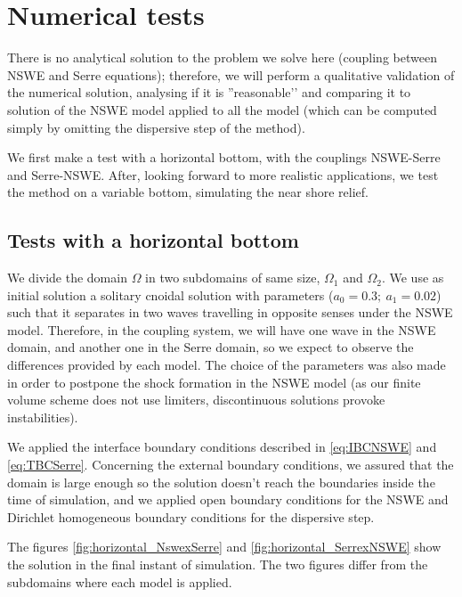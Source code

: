 \section{Numerical tests}

\indent There is no analytical solution to the problem we solve here (coupling between NSWE and Serre equations); therefore, we will perform a qualitative validation of the numerical solution, analysing if it is ''reasonable’’ and comparing it to solution of the NSWE model applied to all the model (which can be computed simply by omitting the dispersive step of the method).

\indent We first make a test with a horizontal bottom, with the couplings NSWE-Serre and Serre-NSWE. After, looking forward to more realistic applications, we test the method on a variable bottom, simulating the near shore relief.

\subsection{Tests with a horizontal bottom}

\indent We divide the domain $\Omega$ in two subdomains of same size, $\Omega_1$ and $\Omega_2$. We use as initial solution a solitary cnoidal solution with parameters ($a_0 = 0.3; \ a_1 = 0.02$) such that it separates in two waves travelling in opposite senses under the NSWE model. Therefore, in the coupling system, we will have one wave in the NSWE domain, and another one in the Serre domain, so we expect to observe the differences provided by each model. The choice of the parameters was also made in order to postpone the shock formation in the NSWE model (as our finite volume scheme does not use limiters, discontinuous solutions provoke instabilities).

\indent We applied the interface boundary conditions described in \eqref{eq:IBCNSWE} and \eqref{eq:TBCSerre}. Concerning the external boundary conditions, we assured that the domain is large enough so the solution doesn't reach the boundaries inside the time of simulation, and we applied open boundary conditions for the NSWE and Dirichlet homogeneous boundary conditions for the dispersive step.

\indent The figures \ref{fig:horizontal_NswexSerre} and \ref{fig:horizontal_SerrexNSWE} show the solution in the final instant of simulation. The two figures differ from the subdomains where each model is applied.

\indent

